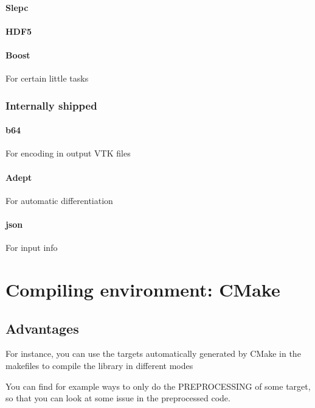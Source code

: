 \documentclass[10pt]{book}
\begin{document}
 
 \subsection{Slepc}

 \subsection{HDF5}
 
 \subsection{Boost}
    
      For certain little tasks
 
 
 \section{Internally shipped}
 
 \subsection{b64}
    
     For encoding in output VTK files
 
 \subsection{Adept}
 
    For automatic differentiation
 
 \subsection{json}
 
    For input info

    
\part{Compiling environment: CMake}


\chapter{Advantages}

  For instance, you can use the targets automatically generated by CMake in the makefiles
  to compile the library in different modes
  
  You can find for example ways to only do the PREPROCESSING of some target,
  so that you can look at some issue in the preprocessed code.
  
\end{document}
